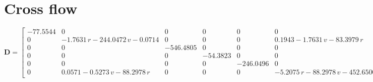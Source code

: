 \documentclass[12pt,a4]{article}
\begin{document}
\section{Cross flow}
\begin{equation*}
	\bm{D} = \left[\begin{array}{cccccc} -77.5544 & 0 & 0 & 0 & 0 & 0\\ 0 & -1.7631\,r-244.0472\,v-0.0714 & 0 & 0 & 0 & 0.1943-1.7631\,v-83.3979\,r\\ 0 & 0 & -546.4805 & 0 & 0 & 0\\ 0 & 0 & 0 & -54.3823 & 0 & 0\\ 0 & 0 & 0 & 0 & -246.0496 & 0\\ 0 & 0.0571-0.5273\,v-88.2978\,r & 0 & 0 & 0 & -5.2075\,r-88.2978\,v-452.6500\,\left|r\right|-452.6500\,r\,\mathrm{sign}\left(r\right)-45.4210 \end{array}\right]
\end{equation*}
\end{document}
